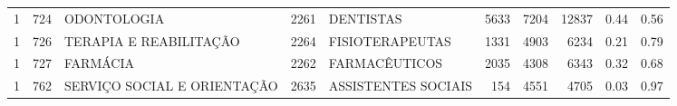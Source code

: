\begin{tabular}{rrlrlrrrrr}
       1 &    724 &                           ODONTOLOGIA & 2261 &                                          DENTISTAS &  5633 &  7204 &  12837 & 0.44 & 0.56 \\
       1 &    726 &                TERAPIA E REABILITAÇÃO & 2264 &                                    FISIOTERAPEUTAS &  1331 &  4903 &   6234 & 0.21 & 0.79 \\
       1 &    727 &                              FARMÁCIA & 2262 &                                      FARMACÊUTICOS &  2035 &  4308 &   6343 & 0.32 & 0.68 \\
       1 &    762 &           SERVIÇO SOCIAL E ORIENTAÇÃO & 2635 &                                ASSISTENTES SOCIAIS &   154 &  4551 &   4705 & 0.03 & 0.97 \\
\bottomrule
\end{tabular}
